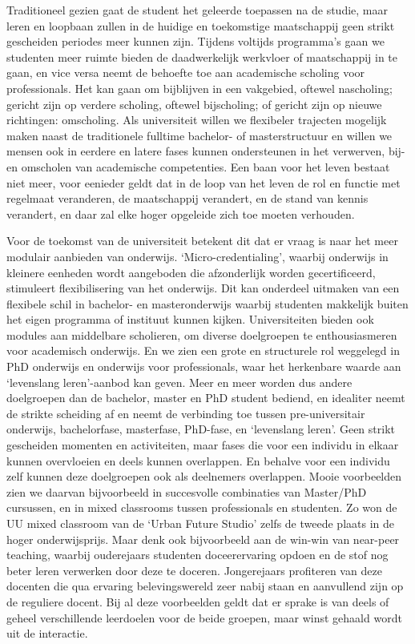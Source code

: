 \documentclass[empirical, authordate, ]{new-jote-article}
\begin{document}
	Traditioneel gezien gaat de student het geleerde toepassen na de studie, maar leren en loopbaan zullen in de huidige en toekomstige maatschappij geen strikt gescheiden periodes meer kunnen zijn. Tijdens voltijds programma's gaan we studenten meer ruimte bieden de daadwerkelijk werkvloer of maatschappij in te gaan, en vice versa neemt de behoefte toe aan academische scholing voor professionals. Het kan gaan om bijblijven in een vakgebied, oftewel nascholing; gericht zijn op verdere scholing, oftewel bijscholing; of gericht zijn op nieuwe richtingen: omscholing. Als universiteit willen we flexibeler trajecten mogelijk maken naast de traditionele fulltime bachelor- of masterstructuur en willen we mensen ook in eerdere en latere fases kunnen ondersteunen in het verwerven, bij- en omscholen van academische competenties. Een baan voor het leven bestaat niet meer, voor eenieder geldt dat in de loop van het leven de rol en functie met regelmaat veranderen, de maatschappij verandert, en de stand van kennis verandert, en daar zal elke hoger opgeleide zich toe moeten verhouden.



	Voor de toekomst van de universiteit betekent dit dat er vraag is naar het meer modulair aanbieden van onderwijs. ‘Micro-credentialing', waarbij onderwijs in kleinere eenheden wordt aangeboden die afzonderlijk worden gecertificeerd, stimuleert flexibilisering van het onderwijs. Dit kan onderdeel uitmaken van een flexibele schil in bachelor- en masteronderwijs waarbij studenten makkelijk buiten het eigen programma of instituut kunnen kijken. Universiteiten bieden ook modules aan middelbare scholieren, om diverse doelgroepen te enthousiasmeren voor academisch onderwijs. En we zien een grote en structurele rol weggelegd in PhD onderwijs en onderwijs voor professionals, waar het herkenbare waarde aan ‘levenslang leren'-aanbod kan geven. Meer en meer worden dus andere doelgroepen dan de bachelor, master en PhD student bediend, en idealiter neemt de strikte scheiding af en neemt de verbinding toe tussen pre-universitair onderwijs, bachelorfase, masterfase, PhD-fase, en ‘levenslang leren'. Geen strikt gescheiden momenten en activiteiten, maar fases die voor een individu in elkaar kunnen overvloeien en deels kunnen overlappen. En behalve voor een individu zelf kunnen deze doelgroepen ook als deelnemers overlappen. Mooie voorbeelden zien we daarvan bijvoorbeeld in succesvolle combinaties van Master/PhD cursussen, en in mixed classrooms tussen professionals en studenten. Zo won de UU mixed classroom van de ‘Urban Future Studio' zelfs de tweede plaats in de hoger onderwijsprijs. Maar denk ook bijvoorbeeld aan de win-win van near-peer teaching, waarbij ouderejaars studenten doceerervaring opdoen en de stof nog beter leren verwerken door deze te doceren. Jongerejaars profiteren van deze docenten die qua ervaring belevingswereld zeer nabij staan en aanvullend zijn op de reguliere docent. Bij al deze voorbeelden geldt dat er sprake is van deels of geheel verschillende leerdoelen voor de beide groepen, maar winst gehaald wordt uit de interactie.
\end{document}
